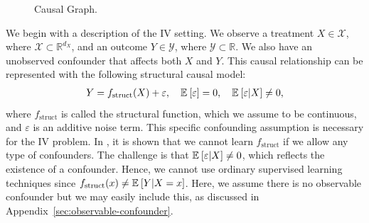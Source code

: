 
\begin{figure}
    \caption{Causal Graph.}
    \label{fig:causal-graph}
\end{figure}
    
We begin with a description of the IV setting. We observe a treatment $X\in \mathcal{X}$, where  $\mathcal{X} \subset \mathbb{R}^{d_X}$, and an outcome $Y\in \mathcal{Y}$, where $\mathcal{Y} \subset \mathbb{R}$.  
We also have an unobserved confounder that affects both $X$ and $Y$. This causal relationship can be represented with the following structural causal model:
\begin{align}\label{eq:structuralcausalmodel}
    Y = f_\mathrm{struct}(X) + \varepsilon, \quad \mathbb{E}_{}\left[\varepsilon\right] = 0, \quad \mathbb{E}_{}\left[\varepsilon | X\right] \neq 0,
\end{align}
where $f_\mathrm{struct}$ is called the structural function, which we assume to be continuous, and $\varepsilon$ is an additive noise term. This specific confounding assumption is necessary for the IV problem. In \citet{Bareinboim2012}, it is shown that we cannot learn $f_\mathrm{struct}$ if we allow any type of confounders. The challenge is that $\mathbb{E}_{}\left[\varepsilon | X\right] \neq 0$, which reflects the existence of a confounder. Hence, we cannot use ordinary supervised learning techniques since $f_\mathrm{struct}(x) \neq \mathbb{E}_{}\left[Y | X=x\right]$.  Here, we assume there is no observable confounder but we may easily include this, as discussed in Appendix~\ref{sec:observable-confounder}. 

